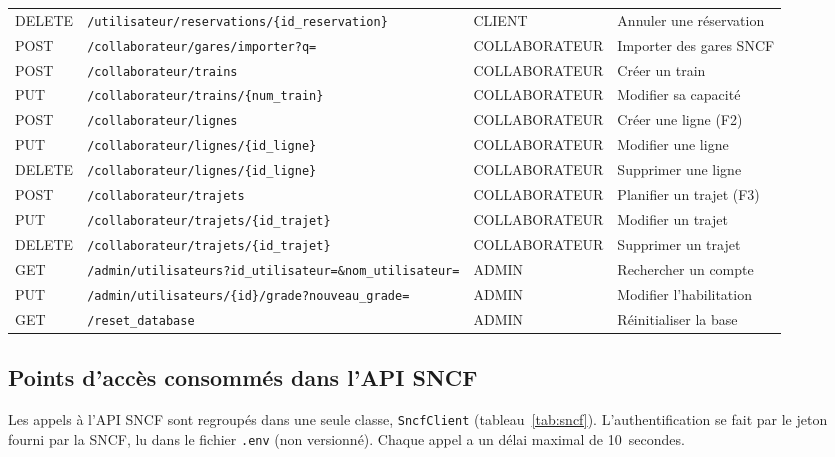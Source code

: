 \documentclass[11pt,a4paper]{article}
\newcommand{\route}[1]{\texttt{#1}}
\newcommand{\code}[1]{\texttt{#1}}
\begin{document}
\begin{longtable}{@{}l p{7.0cm} l >{\raggedright\arraybackslash}p{3.3cm}@{}}
DELETE & \route{/utilisateur/reservations/\{id\_reservation\}} & CLIENT     & Annuler une réservation \\
POST   & \route{/collaborateur/gares/importer?q=}           & COLLABORATEUR & Importer des gares SNCF \\
POST   & \route{/collaborateur/trains}                      & COLLABORATEUR & Créer un train \\
PUT    & \route{/collaborateur/trains/\{num\_train\}}       & COLLABORATEUR & Modifier sa capacité \\
POST   & \route{/collaborateur/lignes}                      & COLLABORATEUR & Créer une ligne (F2) \\
PUT    & \route{/collaborateur/lignes/\{id\_ligne\}}        & COLLABORATEUR & Modifier une ligne \\
DELETE & \route{/collaborateur/lignes/\{id\_ligne\}}        & COLLABORATEUR & Supprimer une ligne \\
POST   & \route{/collaborateur/trajets}                     & COLLABORATEUR & Planifier un trajet (F3) \\
PUT    & \route{/collaborateur/trajets/\{id\_trajet\}}      & COLLABORATEUR & Modifier un trajet \\
DELETE & \route{/collaborateur/trajets/\{id\_trajet\}}      & COLLABORATEUR & Supprimer un trajet \\
GET    & \route{/admin/utilisateurs}\newline\route{?id\_utilisateur=\&nom\_utilisateur=} & ADMIN & Rechercher un compte \\
PUT    & \route{/admin/utilisateurs/\{id\}/grade}\newline\route{?nouveau\_grade=} & ADMIN   & Modifier l'habilitation \\
GET    & \route{/reset\_database}                           & ADMIN         & Réinitialiser la base \\
\end{longtable}
\endgroup

\subsection{Points d'accès consommés dans l'API SNCF}

Les appels à l'API SNCF sont regroupés dans une seule classe, \code{SncfClient}
(tableau~\ref{tab:sncf}). L'authentification se fait par le jeton fourni par la SNCF, lu dans le
fichier \code{.env} (non versionné). Chaque appel a un délai maximal de 10~secondes.
\end{document}
